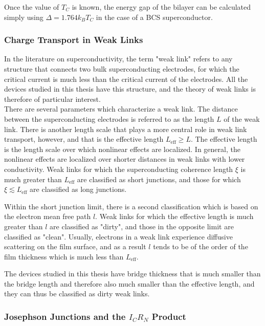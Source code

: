 Once the value of $T_C$ is known, the energy gap of the bilayer can be calculated simply using $\Delta = 1.764 k_BT_C$ in the case of a BCS superconductor.



\subsubsection{Charge Transport in Weak Links}

In the literature on superconductivity, the term "weak link" refers to any structure that connects two bulk superconducting electrodes, for which the critical current is much less than the critical current of the electrodes. All the devices studied in this thesis have this structure, and the theory of weak links is therefore of particular interest.\\


There are several parameters which characterize a weak link. The distance between the superconducting electrodes is referred to as the length $L$ of the weak link. There is another length scale that plays a more central role in weak link transport, however, and that is the effective length $L_\mathrm{eff} \geq L$. The effective length is the length scale over which nonlinear effects are localized. In general, the nonlinear effects are localized over shorter distances in weak links with lower conductivity. Weak links for which the superconducting coherence length $\xi$ is much greater than $L_\mathrm{eff}$ are classified as short junctions, and those for which $\xi \lesssim L_\mathrm{eff}$ are classified as long junctions. 

Within the short junction limit, there is a second classification which is based on the electron mean free path $l$. Weak links for which the effective length is much greater than $l$ are classified as "dirty", and those in the opposite limit are classified as "clean". Usually, electrons in a weak link experience diffusive scattering on the film surface, and as a result $l$ tends to be of the order of the film thickness which is much less than $L_\mathrm{eff}$. 


The devices studied in this thesis have bridge thickness that is much smaller than the bridge length and therefore also much smaller than the effective length, and they can thus be classified as dirty weak links.


\subsubsection{Josephson Junctions and the $I_CR_N$ Product}

